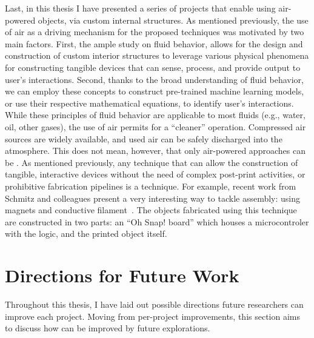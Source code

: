     Last, in this thesis I have presented a series of projects that enable \papf
    using air-powered objects, via custom internal structures. As mentioned
    previously, the use of air as a driving mechanism for the proposed
    techniques was motivated by two main factors. First, the ample study on
    fluid behavior, allows for the design and construction of custom interior
    structures to leverage various physical phenomena for constructing tangible
    devices that can sense, process, and provide output to user's interactions.
    Second, thanks to the broad understanding of fluid behavior, we can employ
    these concepts to construct pre-trained machine learning models, or use
    their respective mathematical equations, to identify user's interactions.
    While these principles of fluid behavior are applicable to most fluids
    (e.g., water, oil, other gases), the use of air permits for a ``cleaner''
    operation. Compressed air sources are widely available, and used air can be
    safely discharged into the atmosphere. This does not mean, however, that
    only air-powered approaches can be \pap.  As mentioned previously, any
    technique that can allow the construction of tangible, interactive devices
    without the need of complex post-print activities, or prohibitive
    fabrication pipelines is a \papf technique. For example, recent work from
    Schmitz and colleagues present a very interesting way to tackle assembly:
    using magnets and conductive filament~\cite{Schmitz:2021}. The objects
    fabricated using this technique are constructed in two parts: an ``Oh Snap!
    board'' which houses a microcontroler with the logic, and the printed object
    itself.

  \section{Directions for Future Work}
    Throughout this thesis, I have laid out possible directions future
    researchers can improve each project. Moving from per-project improvements,
    this section aims to discuss how \papf can be improved by future
    explorations.

